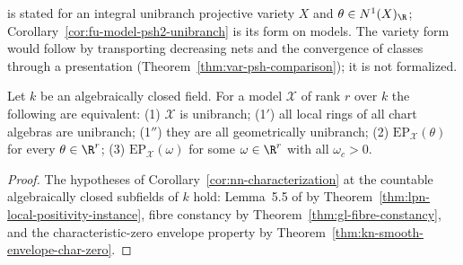 \cite[Corollary~8.4]{FHX} is stated for an integral unibranch projective variety
$X$ and $\theta\in N^1(X)_\R$; Corollary~\ref{cor:fu-model-psh2-unibranch} is its
form on models. The variety form would follow by transporting decreasing nets and
the convergence of classes through a presentation
(Theorem~\ref{thm:var-psh-comparison}); it is not formalized.

\begin{corollary}
\label{cor:fu-model-characterization}
\leanok
Let $k$ be an algebraically closed field. For a model $\mathcal X$ of
rank $r$ over $k$ the following are equivalent: (1) $\mathcal X$ is unibranch;
(1$'$) all local rings of all chart algebras are unibranch; (1$''$) they are
all geometrically unibranch; (2) $\mathrm{EP}_{\mathcal X}(\theta)$ for every
$\theta\in\R^r$; (3) $\mathrm{EP}_{\mathcal X}(\omega)$ for some $\omega\in\R^r$
with all $\omega_c>0$.
\end{corollary}
\begin{proof}
The hypotheses of Corollary~\ref{cor:nn-characterization} at the countable
algebraically closed subfields of $k$ hold: Lemma~5.5 of \cite{FHX} by
Theorem~\ref{thm:lpn-local-positivity-instance}, fibre constancy by
Theorem~\ref{thm:gl-fibre-constancy}, and the characteristic-zero envelope
property by Theorem~\ref{thm:kn-smooth-envelope-char-zero}.
\end{proof}
